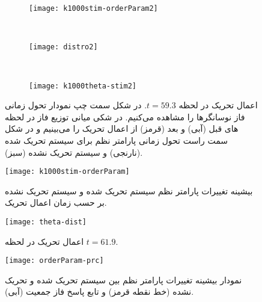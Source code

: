 \begin{figure}
     \centering
     \begin{subfigure}[t]{0.3\textwidth}
         \centering
         \texttt{[image: k1000stim-orderParam2]}
     \end{subfigure}
     \
     \begin{subfigure}[t]{0.2\textwidth}
         \centering
         \texttt{[image: distro2]}
     \end{subfigure}
     \
     \begin{subfigure}[t]{0.4\textwidth}
         \centering
         \texttt{[image: k1000theta-stim2]}
     \end{subfigure}
        \caption{
اعمال تحریک در لحظه 
$t=59.3$.
در شکل سمت چپ نمودار تحول زمانی فاز نوسانگرها را مشاهده می‌کنیم. در شکی میانی توزیع فاز در لحظه های قبل (آبی) و بعد (قرمز) از اعمال تحریک را می‌بینیم و در شکل سمت راست تحول زمانی پارامتر نظم برای سیستم تحریک شده (نارنجی) و سیستم تحریک نشده  (سبز).
         }
\end{figure}



\begin{figure}
	\centering
	\texttt{[image: k1000stim-orderParam]}
    \caption{
بیشینه تغییرات پارامتر نظم سیستم تحریک شده و سیستم تحریک نشده بر حسب زمان اعمال تحریک.
    }
\end{figure}




\begin{figure}
	\centering
	\texttt{[image: theta-dist]}
    \caption{
اعمال تحریک در لحظه 
$t=61.9$.
    }
\end{figure}



\begin{figure}
	\centering
	\texttt{[image: orderParam-prc]}
    \caption{
نمودار بیشینه تغییرات پارامتر نظم بین سیستم تحریک شده و تحریک نشده (خط نقطه قرمز) و تابع پاسخ فاز جمعیت (آبی).
    }
\end{figure}

